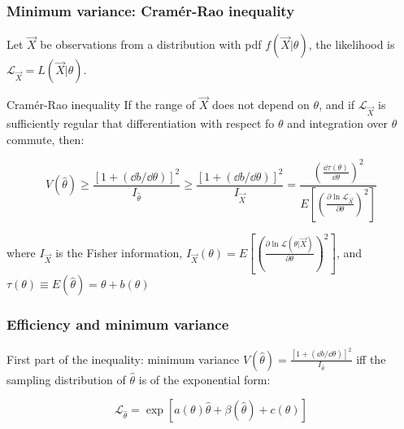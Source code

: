 \documentclass[9pt]{beamer}
\newif\ifmyhide
\newcommand\myhide[1]{%
\ifmyhide \vspace{15pt} \begin{center} \myexample{(blackboard)}\end{center} \vspace{15pt} \else #1 \fi
}
\begin{document}
\begin{frame}
 \frametitle{Minimum variance: Cramér-Rao inequality}
 
 Let $\vec{X}$ be observations from a distribution with pdf $f(\vec{X}|\theta)$, the likelihood is $\mathcal{L}_{\vec{X}} = L(\vec{X}|\theta)$.
 
 \myhide{
 \begin{block}{Cramér-Rao inequality}
 If the range of $\vec{X}$ does not depend on $\theta$, and if $\mathcal{L}_{\vec{X}}$ is sufficiently regular that differentiation with respect fo $\theta$ and integration over 
 $\theta$ commute, then:
 
  $$V(\hat{\theta}) \geq \frac{[1+(\dd b / \dd \theta)]^2}{I_{\hat{\theta}}} 
  \geq \frac{[1+(\dd b / \dd \theta)]^2}{I_{\vec{X}}} 
  = \frac{\left( \frac{\dd \tau(\theta)}{\dd \theta} \right)^2}{E\left[ \left( \frac{\partial \ln \mathcal{L}_{\vec{X}}}{\partial \theta} \right)^2 \right]}$$
  
  where $I_{\vec{X}}$ is the Fisher information, $I_{\vec{X}}(\theta) = E\left[ \left( \frac{\partial \ln \mathcal{L}(\theta|\vec{X})}{\partial \theta} \right)^2 \right]$, and 
  $\tau(\theta) \equiv E(\hat{\theta}) = \theta + b(\theta)$
 \end{block}}

\end{frame}

\begin{frame}
 \frametitle{Efficiency and minimum variance}
 
 \begin{block}{First part of the inequality: minimum variance}
  $V(\hat{\theta}) = \frac{[1+(\dd b / \dd \theta)]^2}{I_{\hat{\theta}}} $ iff the sampling distribution of $\hat{\theta}$ is of the exponential form:
  
  $$\mathcal{L}_{\hat{\theta}} = \exp [a(\theta)\hat{\theta} + \beta(\hat{\theta}) + c(\theta)]$$
 \end{block}
 


\end{frame}
\end{document}
